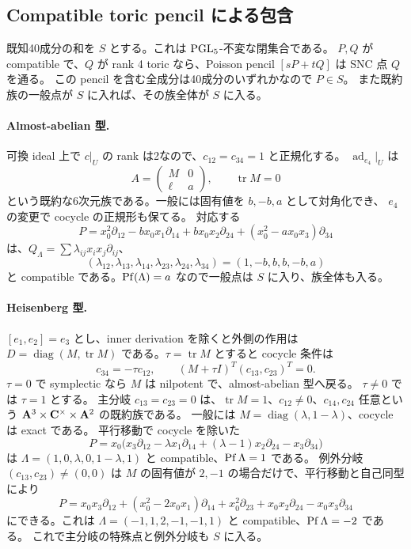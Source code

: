\documentclass[11pt,a4paper]{ltjsarticle}
\DeclareMathOperator{\diag}{diag}\DeclareMathOperator{\Sym}{Sym}\DeclareMathOperator{\Cl}{Cl}
\theoremstyle{remark}\newtheorem{remark}[theorem]{注意}\renewcommand{\proofname}{証明}
\begin{document}
\subsection{Compatible toric pencil による包含}
既知40成分の和を $S$ とする。これは $\operatorname{PGL}_5$-不変な閉集合である。
$P,Q$ が compatible で、$Q$ が rank 4 toric なら、Poisson pencil $[sP+tQ]$ は SNC 点 $Q$ を通る。
この pencil を含む全成分は40成分のいずれかなので $P\in S$。
また既約族の一般点が $S$ に入れば、その族全体が $S$ に入る。

\paragraph{Almost-abelian 型.}
可換 ideal 上で $c|_U$ の rank は2なので、$c_{12}=c_{34}=1$ と正規化する。
$\operatorname{ad}_{e_4}|_U$ は
\[
 A=\begin{pmatrix}M&0\\\ell&a\end{pmatrix},\qquad\operatorname{tr}M=0
\]
という既約な6次元族である。一般には固有値を $b,-b,a$ として対角化でき、
$e_4$ の変更で cocycle の正規形も保てる。
対応する
\[
 P=x_0^2\partial_{12}-b x_0x_1\partial_{14}
 +b x_0x_2\partial_{24}+(x_0^2-a x_0x_3)\partial_{34}
\]
は、$Q_\Lambda=\sum\lambda_{ij}x_ix_j\partial_{ij}$、
\[
 (\lambda_{12},\lambda_{13},\lambda_{14},\lambda_{23},\lambda_{24},\lambda_{34})
 =(1,-b,b,b,-b,a)
\]
と compatible である。$\operatorname{Pf}(\Lambda)=a$ なので一般点は $S$ に入り、族全体も入る。

\paragraph{Heisenberg 型.}
$[e_1,e_2]=e_3$ とし、inner derivation を除くと外側の作用は
$D=\diag(M,\operatorname{tr}M)$ である。$\tau=\operatorname{tr}M$ とすると cocycle 条件は
\[
 c_{34}=-\tau c_{12},\qquad
 (M+\tau I)^T(c_{13},c_{23})^T=0.
\]
$\tau=0$ で symplectic なら $M$ は nilpotent で、almost-abelian 型へ戻る。
$\tau\ne0$ では $\tau=1$ とする。
主分岐 $c_{13}=c_{23}=0$ は、$\operatorname{tr}M=1$、$c_{12}\ne0$、$c_{14},c_{24}$ 任意という
$\mathbf A^3\times\mathbf C^\times\times\mathbf A^2$ の既約族である。
一般には $M=\diag(\lambda,1-\lambda)$、cocycle は exact である。
平行移動で cocycle を除いた
\[
 P=x_0\bigl(x_3\partial_{12}-\lambda x_1\partial_{14}
 +(\lambda-1)x_2\partial_{24}-x_3\partial_{34}\bigr)
\]
は $\Lambda=(1,0,\lambda,0,1-\lambda,1)$ と compatible、$\operatorname{Pf}\Lambda=1$ である。
例外分岐 $(c_{13},c_{23})\ne(0,0)$ は $M$ の固有値が $2,-1$ の場合だけで、平行移動と自己同型により
\[
 P=x_0x_3\partial_{12}+(x_0^2-2x_0x_1)\partial_{14}
 +x_0^2\partial_{23}+x_0x_2\partial_{24}-x_0x_3\partial_{34}
\]
にできる。これは $\Lambda=(-1,1,2,-1,-1,1)$ と compatible、$\operatorname{Pf}\Lambda=-2$ である。
これで主分岐の特殊点と例外分岐も $S$ に入る。
\end{document}
